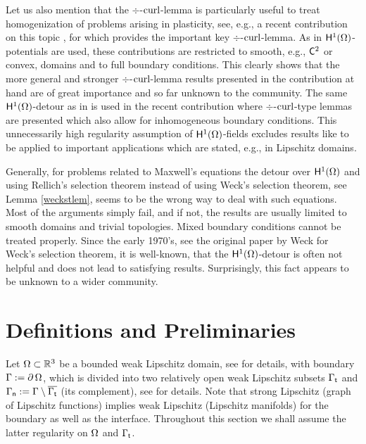 \documentclass[a4paper]{amsart}
\begin{document}
Let us also mention that the $\div$-$\operatorname{curl}$-lemma
is particularly useful to treat homogenization of problems arising in plasticity,
see, e.g., a recent contribution on this topic \cite{roegerschweizer2017},
for which \cite{schweizer2017} provides the important key $\div$-$\operatorname{curl}$-lemma.
As in \cite{schweizer2017,roegerschweizer2017} $\overset{}{\mathsf{H}}{}^{1}_{}(\Omega)$-potentials are used, 
these contributions are restricted to smooth, e.g., $\overset{}{\mathsf{C}}{}^{2}_{}$ or convex,
domains and to full boundary conditions.
This clearly shows that the more general and stronger $\div$-$\operatorname{curl}$-lemma results
presented in the contribution at hand are of great importance
and so far unknown to the community.
The same $\overset{}{\mathsf{H}}{}^{1}_{}(\Omega)$-detour as in \cite{schweizer2017,roegerschweizer2017} 
is used in the recent contribution \cite{kozonoyanagisawa2013} 
where $\div$-$\operatorname{curl}$-type lemmas are presented
which also allow for inhomogeneous boundary conditions.
This unnecessarily high regularity assumption of $\overset{}{\mathsf{H}}{}^{1}_{}(\Omega)$-fields
excludes results like
\cite{kozonoyanagisawa2013,schweizer2017,roegerschweizer2017}
to be applied to important applications 
which are stated, e.g., in Lipschitz domains.

Generally, for problems related to Maxwell's equations
the detour over $\overset{}{\mathsf{H}}{}^{1}_{}(\Omega)$ and using Rellich's selection theorem
instead of using Weck's selection theorem, see Lemma \ref{weckstlem},
seems to be the wrong way to deal with such equations.
Most of the arguments simply fail, and if not,
the results are usually limited to smooth domains and trivial topologies.
Mixed boundary conditions cannot be treated properly.
Since the early 1970's, see the original paper by Weck \cite{weckmax}
for Weck's selection theorem,
it is well-known, that the $\overset{}{\mathsf{H}}{}^{1}_{}(\Omega)$-detour is often not helpful
and does not lead to satisfying results.
Surprisingly, this fact appears to be unknown to a wider community.

\section{Definitions and Preliminaries}

Let $\Omega\subset\mathbb{R}^{3}$ be a bounded weak Lipschitz domain, 
see \cite[Definition 2.3]{bauerpaulyschomburgmcpweaklip} for details, with boundary $\Gamma:=\operatorname{\partial}\Omega$, 
which is divided into two relatively open weak Lipschitz subsets $\Gamma_{\mathsf{t}}$ 
and $\Gamma_{\mathsf{n}}:=\Gamma\setminus\overline{\Gamma_{\mathsf{t}}}$ (its complement),
see \cite[Definition 2.5]{bauerpaulyschomburgmcpweaklip} for details.
Note that strong Lipschitz (graph of Lipschitz functions) implies weak Lipschitz (Lipschitz manifolds)
for the boundary as well as the interface. 
Throughout this section we shall assume the latter regularity on $\Omega$ and $\Gamma_{\mathsf{t}}$.
\end{document}
